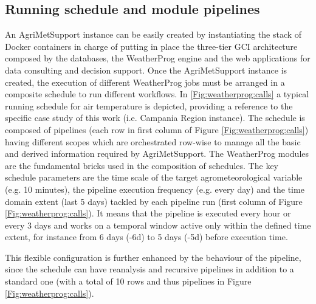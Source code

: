 \documentclass[authoryear,preprint,review,12pt]{elsarticle}
\begin{document}
\subsection{ Running schedule and module pipelines }
An AgriMetSupport instance can be easily created by instantiating the stack of Docker containers in charge of putting in place the three-tier GCI architecture composed by the databases, the WeatherProg engine and the web applications for data consulting and decision support.
Once the AgriMetSupport instance is created, the execution of different WeatherProg jobs must be arranged in a composite schedule to run %
different workflows.
In \cref{Fig:weatherprog:calls} a typical running schedule for air temperature is depicted, providing a reference to the specific case study of this work (i.e. Campania Region instance).
The schedule is composed of pipelines (each row in first column of Figure \ref{Fig:weatherprog:calls}) having different scopes which are orchestrated row-wise to manage all the basic and derived information required by AgriMetSupport.
The WeatherProg modules are the fundamental bricks used in the composition of schedules.
The key schedule parameters are the time scale of the target agrometeorological variable (e.g. 10 minutes), the pipeline execution frequency (e.g. every day) and the time domain extent (last 5 days) tackled by each pipeline run (first column of Figure \ref{Fig:weatherprog:calls}).
It means that the pipeline is executed every hour or every 3 days and works on a temporal window active only within the defined time extent, for instance from 6 days (-6d) to 5 days (-5d) before execution time.

This flexible configuration is further enhanced by the behaviour of the pipeline, since the schedule can have reanalysis and recursive pipelines in addition to a standard one (with a total of 10 rows and thus pipelines in Figure \ref{Fig:weatherprog:calls}).
\end{document}
